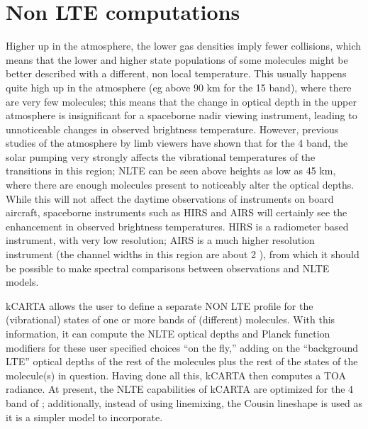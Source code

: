\documentclass[11pt]{article}
\newcommand{\kc}{\textsf{kCARTA}\xspace}
\begin{document}
\section{Non LTE computations}
Higher up in the atmosphere, the lower gas densities imply fewer collisions, 
which means that the lower and higher state populations of some molecules 
might be better described with a different, non local temperature. This 
usually happens quite high up in the atmosphere (eg above 90 km for the 15 \um
\cd band), where there are very few molecules; this means that the change in 
optical depth in the upper atmosphere is insignificant for a spaceborne 
nadir viewing instrument, leading to unnoticeable changes in observed 
brightness temperature. However, previous studies of the atmosphere by limb 
viewers have shown that for the 4 \um \cd band, the solar pumping very strongly
affects the vibrational temperatures of the transitions in this region; NLTE
can be seen above heights as low as 45 km, where there are enough molecules
present to noticeably alter the optical depths. While this will not affect the 
daytime observations of instruments on board aircraft, spaceborne instruments
such as HIRS and AIRS will certainly see the enhancement in observed brightness
temperatures. HIRS is a radiometer based instrument, with very low resolution;
AIRS is a much higher resolution instrument (the channel widths in this region
are about 2 \wn), from which it should be possible to make spectral 
comparisons between observations and NLTE models.

\kc allows the user to define a separate NON LTE profile for the (vibrational) 
states of one or more bands of (different) molecules. With this information, 
it can compute the NLTE optical depths and Planck function modifiers for 
these user specified choices ``on the fly,'' adding on the ``background LTE'' 
optical depths of the rest of the molecules plus the rest of the states of 
the molecule(s) in question. Having done all this, \kc then computes a 
TOA radiance. At present, the NLTE capabilities of \kc are optimized for the 
4 \um band of \cd; additionally, instead of using linemixing, the Cousin 
lineshape is used as it is a simpler model to incorporate.
\end{document}
